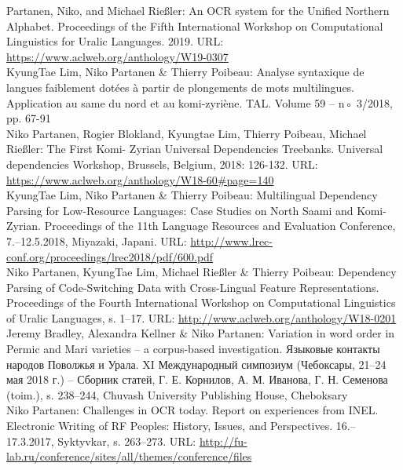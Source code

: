 \documentclass[11pt, a4paper]{article}
\newcommand{\years}[1]{\marginnote{\scriptsize #1}} %
\begin{document}
\years{2019}Partanen, Niko, and Michael Rießler: An OCR system for the Unified Northern Alphabet. Proceedings of the Fifth International Workshop on Computational Linguistics for Uralic Languages. 2019. URL: \url{https://www.aclweb.org/anthology/W19-0307}\\

\years{2018}KyungTae Lim, Niko Partanen \& Thierry Poibeau: Analyse syntaxique de langues faiblement dotées à partir de plongements de mots multilingues. Application au same du nord et au komi-zyriène. TAL. Volume 59 – n◦ 3/2018, pp. 67-91\\

\years{2018} Niko Partanen, Rogier Blokland, Kyungtae Lim, Thierry Poibeau, Michael Rießler: The First Komi- Zyrian Universal Dependencies Treebanks. Universal dependencies Workshop, Brussels, Belgium, 2018: 126-132. URL: \url{https://www.aclweb.org/anthology/W18-60#page=140}\\

\years{2018} KyungTae Lim, Niko Partanen \& Thierry Poibeau: Multilingual Dependency Parsing for Low-Resource Languages: Case Studies on North Saami and Komi-Zyrian. Proceedings of the 11th Language Resources and Evaluation Conference, 7.--12.5.2018, Miyazaki, Japani. URL: \url{http://www.lrec-conf.org/proceedings/lrec2018/pdf/600.pdf}\\

\years{2018} Niko Partanen, KyungTae Lim, Michael Rießler \& Thierry Poibeau: Dependency Parsing of Code-Switching Data with Cross-Lingual Feature Representations. Proceedings of the Fourth International Workshop on Computational Linguistics of Uralic Languages, s. 1--17. URL: \url{http://www.aclweb.org/anthology/W18-0201}\\

\years{2018} Jeremy Bradley, Alexandra Kellner \& Niko Partanen: Variation in word order in Permic and Mari varieties – a corpus-based investigation. Языковые контакты народов Поволжья и Урала. XI Международный симпозиум (Чебоксары, 21–24 мая 2018 г.) – Сборник статей, Г. Е. Корнилов, А. М. Иванова, Г. Н. Семенова (toim.), s. 238–244, Chuvash University Publishing House, Cheboksary\\

\years{2017} Niko Partanen: Challenges in OCR today. Report on experiences from INEL. Electronic Writing of RF Peoples: History, Issues, and Perspectives. 16.--17.3.2017, Syktyvkar, s. 263--273. URL: \url{http://fu-lab.ru/conference/sites/all/themes/conference/files}\\
\end{document}

